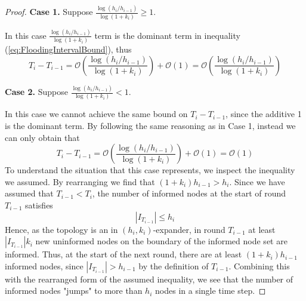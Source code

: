\begin{proof}



	\textbf{Case 1.} Suppose $\frac{\log (h_i/h_{i-1})}{\log(1+k_i)} \geq 1$.

	In this case $\frac{\log (h_i/h_{i-1})}{\log(1+k_i)}$ term is the dominant term in inequality (\ref{eq:FloodingIntervalBound}), thus
	$$
		T_i - T_{i-1} = \mathcal{O}\left( \frac{\log (h_i/h_{i-1})}{\log(1+k_i) }\right) + \mathcal{O}(1) = \mathcal{O}\left( \frac{\log (h_i/h_{i-1})}{\log(1+k_i) }\right)
	$$

	\textbf{Case 2.} Suppose $\frac{\log (h_i/h_{i-1})}{\log(1+k_i)} < 1$.

	In this case we cannot achieve the same bound on $T_i - T_{i-1}$, since the additive 1 is the dominant term. By following the same reasoning as in Case 1, instead we can only obtain that
	\begin{equation}\label{eq:Weak1StepBound}
		T_i - T_{i-1} = \mathcal{O}\left( \frac{\log (h_i/h_{i-1})}{\log(1+k_i) }\right) + \mathcal{O}(1) = \mathcal{O}(1)
	\end{equation}
	To understand the situation that this case represents, we inspect the inequality we assumed.
	By rearranging we find that $(1+k_i)h_{i-1} > h_i$. Since we have assumed that $T_{i-1} < T_i$, %
	the number of informed nodes at the start of round $T_{i-1}$ satisfies
	$$
		|I_{T_{i-1}}| \leq h_i
	$$
	Hence, as the topology is an in $(h_i, k_i)$-expander, in round $T_{i-1}$ at least $|I_{T_{i-1}}|k_i$ new uninformed nodes on the boundary of the informed node set are informed. Thus, at the start of the next round, there are at least $(1+k_i)h_{i-1}$ informed nodes, since $|I_{T_{i-1}}| > h_{i-1}$ by the definition of $T_{i-1}$. Combining this with the rearranged form of the assumed inequality, we see that the number of informed nodes "jumps" to more than $h_i$ nodes in a single time step.


\end{proof}
